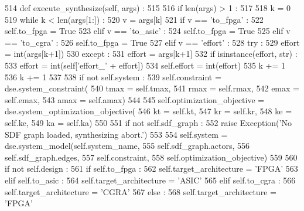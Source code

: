 \begin{DoxyCode}
514   \textcolor{keyword}{def }execute\_synthesize(self, args) :
515 
516     \textcolor{keywordflow}{if} len(args) > 1 :
517 
518       k = 0
519       \textcolor{keywordflow}{while} k < len(args[1:]) :
520         v = args[k]
521         \textcolor{keywordflow}{if} v == \textcolor{stringliteral}{'to\_fpga'} :
522           self.to\_fpga = \textcolor{keyword}{True}
523         \textcolor{keywordflow}{elif} v == \textcolor{stringliteral}{'to\_asic'} :
524           self.to\_fpga = \textcolor{keyword}{True}
525         \textcolor{keywordflow}{elif} v == \textcolor{stringliteral}{'to\_cgra'} :
526           self.to\_fpga = \textcolor{keyword}{True}
527         \textcolor{keywordflow}{elif} v == \textcolor{stringliteral}{'effort'} :
528           \textcolor{keywordflow}{try} :
529             effort = int(args[k+1])
530           \textcolor{keywordflow}{except} :
531             effort = args[k+1]
532           \textcolor{keywordflow}{if} isinstance(effort, str) :
533             effort = int(self[\textcolor{stringliteral}{'effort\_'} + effort])
534           self.effort = int(effort)
535           k += 1
536         k += 1
537 
538     \textcolor{keywordflow}{if} \textcolor{keywordflow}{not} self.system :
539       self.constraint = dse.system\_constraint(
540         tmax = self.tmax,
541         rmax = self.rmax,
542         emax = self.emax,
543         amax = self.amax)
544 
545       self.optimization\_objective = dse.system\_optimization\_objective(
546         kt = self.kt,
547         kr = self.kr,
548         ke = self.ke,
549         ka = self.ka)
550 
551       \textcolor{keywordflow}{if} \textcolor{keywordflow}{not} self.sdf\_graph :
552         \textcolor{keywordflow}{raise} Exception(\textcolor{stringliteral}{'No SDF graph loaded, synthesizing abort.'})
553 
554       self.system = dse.system\_model(self.system\_name,
555         self.sdf\_graph.actors,
556         self.sdf\_graph.edges,
557         self.constraint,
558         self.optimization\_objective)
559 
560     \textcolor{keywordflow}{if} \textcolor{keywordflow}{not} self.design :
561       \textcolor{keywordflow}{if} self.to\_fpga :
562         self.target\_architecture = \textcolor{stringliteral}{'FPGA'}
563       \textcolor{keywordflow}{elif} self.to\_asic :
564         self.target\_architecture = \textcolor{stringliteral}{'ASIC'}
565       \textcolor{keywordflow}{elif} self.to\_cgra :
566         self.target\_architecture = \textcolor{stringliteral}{'CGRA'}
567       \textcolor{keywordflow}{else} :
568         self.target\_architecture = \textcolor{stringliteral}{'FPGA'}

\end{DoxyCode}
